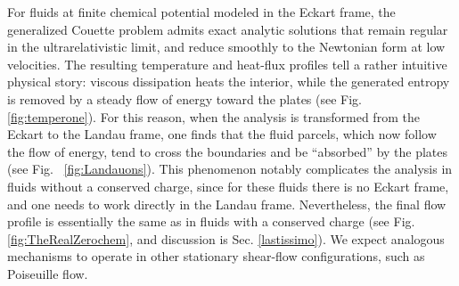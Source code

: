 \documentclass[a4paper, amsfonts, amssymb, amsmath, reprint, showkeys, nofootinbib, twoside,notitlepage,onecolumn]{revtex4-1}
\theoremstyle{definition}
\theoremstyle{theorem}
\begin{document}
For fluids at finite chemical potential modeled in the Eckart frame, the generalized Couette problem admits exact analytic solutions that remain regular in the ultrarelativistic limit, and reduce smoothly to the Newtonian form at low velocities. The resulting temperature and heat-flux profiles tell a rather intuitive physical story: viscous dissipation heats the interior, while the generated entropy is removed by a steady flow of energy toward the plates (see Fig.~ \ref{fig:temperone}). For this reason, when the analysis is transformed from the Eckart to the Landau frame, one finds that the fluid parcels, which now follow the flow of energy, tend to cross the boundaries and be ``absorbed'' by the plates (see Fig.~ \ref{fig:Landauons}). This phenomenon notably complicates the analysis in fluids without a conserved charge, since for these fluids there is no Eckart frame, and one needs to work directly in the Landau frame. Nevertheless, the final flow profile is essentially the same as in fluids with a conserved charge (see Fig.~ \ref{fig:TheRealZerochem}, and discussion is Sec. \ref{lastissimo}). We expect analogous mechanisms to operate in other stationary shear-flow configurations, such as Poiseuille flow.


\end{document}
